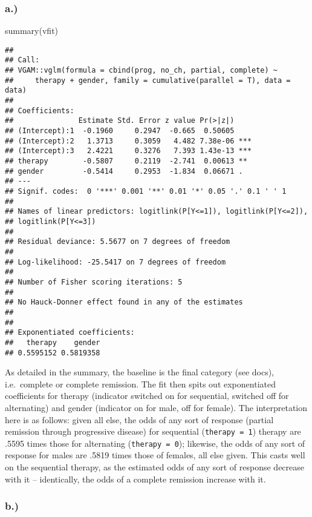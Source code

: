 \documentclass[
]{article}
\newenvironment{Shaded}{\begin{snugshade}}{\end{snugshade}}
\newcommand{\FunctionTok}[1]{\textcolor[rgb]{0.00,0.00,0.00}{#1}}
\newcommand{\NormalTok}[1]{#1}
\begin{document}
\hypertarget{a.-1}{%
\subsubsection{a.)}\label{a.-1}}

\begin{Shaded}
\begin{Highlighting}[]
\FunctionTok{summary}\NormalTok{(vfit)}
\end{Highlighting}
\end{Shaded}

\begin{verbatim}
## 
## Call:
## VGAM::vglm(formula = cbind(prog, no_ch, partial, complete) ~ 
##     therapy + gender, family = cumulative(parallel = T), data = data)
## 
## Coefficients: 
##               Estimate Std. Error z value Pr(>|z|)    
## (Intercept):1  -0.1960     0.2947  -0.665  0.50605    
## (Intercept):2   1.3713     0.3059   4.482 7.38e-06 ***
## (Intercept):3   2.4221     0.3276   7.393 1.43e-13 ***
## therapy        -0.5807     0.2119  -2.741  0.00613 ** 
## gender         -0.5414     0.2953  -1.834  0.06671 .  
## ---
## Signif. codes:  0 '***' 0.001 '**' 0.01 '*' 0.05 '.' 0.1 ' ' 1
## 
## Names of linear predictors: logitlink(P[Y<=1]), logitlink(P[Y<=2]), 
## logitlink(P[Y<=3])
## 
## Residual deviance: 5.5677 on 7 degrees of freedom
## 
## Log-likelihood: -25.5417 on 7 degrees of freedom
## 
## Number of Fisher scoring iterations: 5 
## 
## No Hauck-Donner effect found in any of the estimates
## 
## 
## Exponentiated coefficients:
##   therapy    gender 
## 0.5595152 0.5819358
\end{verbatim}

As detailed in the summary, the baseline is the final category (see
docs), i.e.~complete or complete remission. The fit then spits out
exponentiated coefficients for therapy (indicator switched on for
sequential, switched off for alternating) and gender (indicator on for
male, off for female). The interpretation here is as follows: given all
else, the odds of any sort of response (partial remission through
progressive disease) for sequential (\texttt{therapy\ =\ 1}) therapy are
.5595 times those for alternating (\texttt{therapy\ =\ 0}); likewise,
the odds of any sort of response for males are .5819 times those of
females, all else given. This casts well on the sequential therapy, as
the estimated odds of any sort of response decrease with it --
identically, the odds of a complete remission increase with it.

\hypertarget{b.-1}{%
\subsubsection{b.)}\label{b.-1}}
\end{document}
